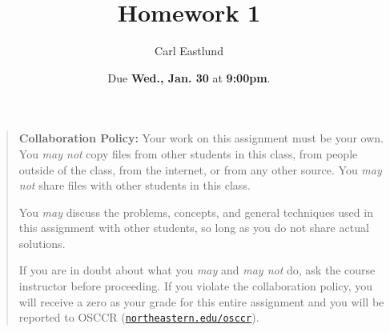\documentclass{article}
\title{Homework 1}
\author{Carl Eastlund}
\date{Due \textbf{Wed., Jan. 30} at \textbf{9:00pm}.}
\begin{document}
\maketitle

\newcommand\link[2][http://]{\href{#1#2}{\nolinkurl{#2}}}
\newcommand\http[1]{\link[http://]{#1}}
\newcommand\https[1]{\link[https://]{#1}}
\newcommand\email[1]{\link[mailto:]{#1}}

\begin{quotation}

  \noindent \textbf{Collaboration Policy:} Your work on this assignment must be
  your own.  You \emph{may not} copy files from other students in this class,
  from people outside of the class, from the internet, or from any other source.
  You \emph{may not} share files with other students in this class.

  \medskip

  \noindent You \emph{may} discuss the problems, concepts, and general
  techniques used in this assignment with other students, so long as you do not
  share actual solutions.

  \medskip

  \noindent If you are in doubt about what you \emph{may} and \emph{may not} do,
  ask the course instructor before proceeding.  If you violate the collaboration
  policy, you will receive a zero as your grade for this entire assignment and
  you will be reported to OSCCR (\link{northeastern.edu/osccr}).

\end{quotation}
\end{document}
